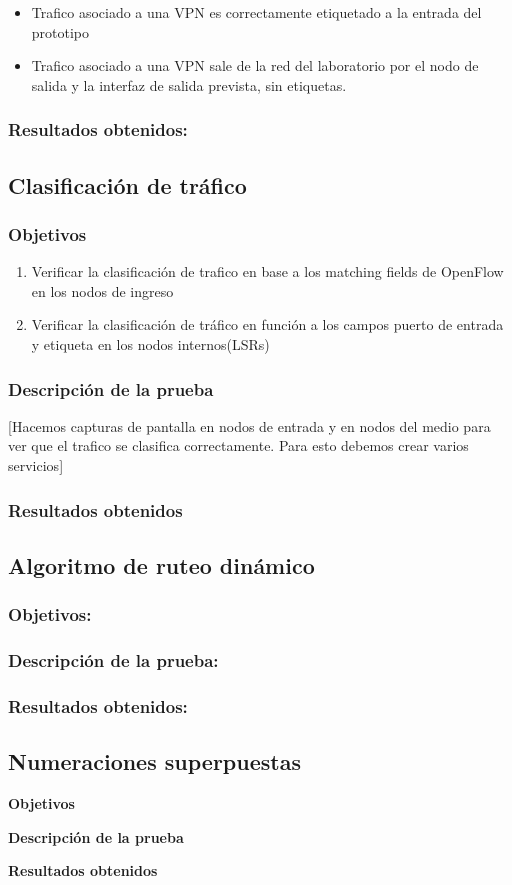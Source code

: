 \begin{itemize}
\item Trafico asociado a una VPN es correctamente etiquetado a la entrada del prototipo
\item Trafico asociado a una VPN sale de la red del laboratorio por el nodo de salida y la interfaz de salida prevista, sin etiquetas.
\end{itemize}

\subsubsection{Resultados obtenidos:}

\subsection{Clasificación de tr\'afico}

\subsubsection{Objetivos}
\begin{enumerate}
\item Verificar la clasificación de trafico en base a los matching fields de OpenFlow en los nodos de ingreso
\item Verificar la clasificación de tr\'afico en función a los campos puerto de entrada y etiqueta en los nodos internos(LSRs)
\end{enumerate}

\subsubsection{Descripción de la prueba}
[Hacemos capturas de pantalla en nodos de entrada y en nodos del medio para ver que el trafico se clasifica correctamente. Para esto debemos crear varios servicios]

\subsubsection{Resultados obtenidos}

\subsection{Algoritmo de ruteo dinámico}

\subsubsection{Objetivos:}


\subsubsection{Descripción de la prueba:}


\subsubsection{Resultados obtenidos:}


\subsection{Numeraciones superpuestas}

\textbf{Objetivos}

\textbf{Descripción de la prueba}

\textbf{Resultados obtenidos}